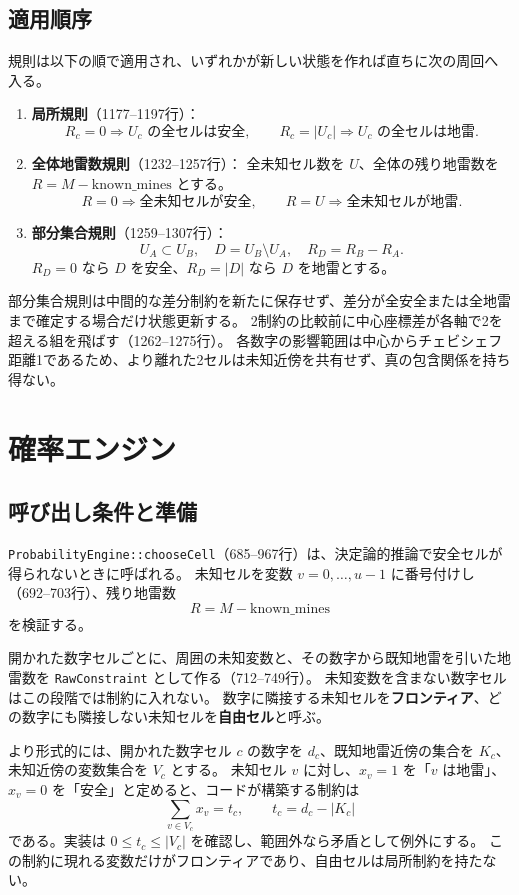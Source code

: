 \documentclass[uplatex,dvipdfmx,11pt]{jsarticle}
\newcommand{\code}[1]{\texttt{#1}}
\begin{document}
\subsection{適用順序}
規則は以下の順で適用され、いずれかが新しい状態を作れば直ちに次の周回へ入る。

\begin{enumerate}
  \item \textbf{局所規則}（1177--1197行）：
  \[
  R_c=0 \Rightarrow U_c\text{ の全セルは安全},\qquad
  R_c=|U_c| \Rightarrow U_c\text{ の全セルは地雷}.
  \]
  \item \textbf{全体地雷数規則}（1232--1257行）：
  全未知セル数を $U$、全体の残り地雷数を $R=M-\mathrm{known\_mines}$ とする。
  \[
  R=0 \Rightarrow \text{全未知セルが安全},\qquad
  R=U \Rightarrow \text{全未知セルが地雷}.
  \]
  \item \textbf{部分集合規則}（1259--1307行）：
  \[
  U_A\subset U_B,\quad
  D=U_B\setminus U_A,\quad
  R_D=R_B-R_A.
  \]
  \(R_D=0\) なら \(D\) を安全、\(R_D=|D|\) なら \(D\) を地雷とする。
\end{enumerate}

部分集合規則は中間的な差分制約を新たに保存せず、差分が全安全または全地雷まで確定する場合だけ状態更新する。
2制約の比較前に中心座標差が各軸で2を超える組を飛ばす（1262--1275行）。
各数字の影響範囲は中心からチェビシェフ距離1であるため、より離れた2セルは未知近傍を共有せず、真の包含関係を持ち得ない。

\section{確率エンジン}

\subsection{呼び出し条件と準備}
\code{ProbabilityEngine::chooseCell}（685--967行）は、決定論的推論で安全セルが得られないときに呼ばれる。
未知セルを変数 $v=0,\ldots,u-1$ に番号付けし（692--703行）、残り地雷数
\[
  R=M-\mathrm{known\_mines}
\]
を検証する。

開かれた数字セルごとに、周囲の未知変数と、その数字から既知地雷を引いた地雷数を \code{RawConstraint} として作る（712--749行）。
未知変数を含まない数字セルはこの段階では制約に入れない。
数字に隣接する未知セルを\textbf{フロンティア}、どの数字にも隣接しない未知セルを\textbf{自由セル}と呼ぶ。

より形式的には、開かれた数字セル $c$ の数字を $d_c$、既知地雷近傍の集合を $K_c$、未知近傍の変数集合を $V_c$ とする。
未知セル $v$ に対し、$x_v=1$ を「$v$ は地雷」、$x_v=0$ を「安全」と定めると、コードが構築する制約は
\[
  \sum_{v\in V_c}x_v
  =t_c,\qquad
  t_c=d_c-|K_c|
\]
である。実装は $0\le t_c\le |V_c|$ を確認し、範囲外なら矛盾として例外にする。
この制約に現れる変数だけがフロンティアであり、自由セルは局所制約を持たない。
\end{document}
